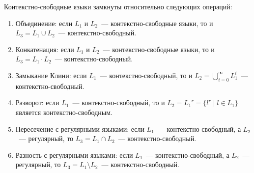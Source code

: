 \begin{theorem}
    Контекстно-свободные языки замкнуты относительно следующих операций:
    \begin{enumerate}
        \item Объединение: если $L_1$ и $L_2$~--- контекстно-свободные языки, то и $L_3 = L_1 \cup L_2$~--- контекстно-свободный.
        \item Конкатенация: если $L_1$ и $L_2$~--- контекстно-свободные языки, то и $L_3 = L_1 \cdot L_2$~--- контекстно-свободный.
        \item Замыкание Клини: если $L_1$~--- контекстно-свободный, то и $L_2 = \bigcup\limits_{i=0}^{\infty} L_1^i $~--- контекстно-свободный.
        \item Разворот: если $L_1$~--- контекстно-свободный, то и $L_2 = {L_1}^r = \{ l^r \mid l \in L_1\}$ является контекстно-свободным.
        \item Пересечение с регулярными языками: если $L_1$~--- контекстно-свободный, а $L_2$~--- регулярный, то  $L_3 = L_1 \cap L_2$~--- контекстно-свободный.
        \item Разность с регулярными языками: если $L_1$~--- контекстно-свободный, а $L_2$~--- регулярный, то  $L_3 = L_1 \setminus L_2$~--- контекстно-свободный.
    \end{enumerate}
\end{theorem}
